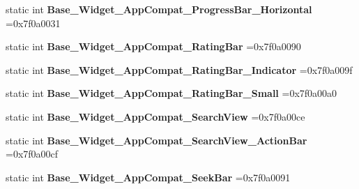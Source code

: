 \begin{DoxyCompactItemize}
\item 
\mbox{\label{classandroid_1_1support_1_1v7_1_1mediarouter_1_1R_1_1style_a1d127f4b108c89b1654de93ad7366b8a}} 
static int {\bfseries Base\+\_\+\+Widget\+\_\+\+App\+Compat\+\_\+\+Progress\+Bar\+\_\+\+Horizontal} =0x7f0a0031
\item 
\mbox{\label{classandroid_1_1support_1_1v7_1_1mediarouter_1_1R_1_1style_a3ad85773b6b90c644a29e21d0be02092}} 
static int {\bfseries Base\+\_\+\+Widget\+\_\+\+App\+Compat\+\_\+\+Rating\+Bar} =0x7f0a0090
\item 
\mbox{\label{classandroid_1_1support_1_1v7_1_1mediarouter_1_1R_1_1style_ac19ad0a043c265be083e63ac8ae3d610}} 
static int {\bfseries Base\+\_\+\+Widget\+\_\+\+App\+Compat\+\_\+\+Rating\+Bar\+\_\+\+Indicator} =0x7f0a009f
\item 
\mbox{\label{classandroid_1_1support_1_1v7_1_1mediarouter_1_1R_1_1style_afd0861bc8ea6ffa1475ca60ec4793bc4}} 
static int {\bfseries Base\+\_\+\+Widget\+\_\+\+App\+Compat\+\_\+\+Rating\+Bar\+\_\+\+Small} =0x7f0a00a0
\item 
\mbox{\label{classandroid_1_1support_1_1v7_1_1mediarouter_1_1R_1_1style_a0df7f4bac41e03c14770addfe361ae02}} 
static int {\bfseries Base\+\_\+\+Widget\+\_\+\+App\+Compat\+\_\+\+Search\+View} =0x7f0a00ce
\item 
\mbox{\label{classandroid_1_1support_1_1v7_1_1mediarouter_1_1R_1_1style_a836959b5253dfa5f71da5311331937b2}} 
static int {\bfseries Base\+\_\+\+Widget\+\_\+\+App\+Compat\+\_\+\+Search\+View\+\_\+\+Action\+Bar} =0x7f0a00cf
\item 
\mbox{\label{classandroid_1_1support_1_1v7_1_1mediarouter_1_1R_1_1style_aa216606a6624638b13dee5d648155aa7}} 
static int {\bfseries Base\+\_\+\+Widget\+\_\+\+App\+Compat\+\_\+\+Seek\+Bar} =0x7f0a0091
\item 
\mbox{\label{classandroid_1_1support_1_1v7_1_1mediarouter_1_1R_1_1style_a25ccfa52c0433255cb5b749d4e666969}} 

\end{DoxyCompactItemize}
